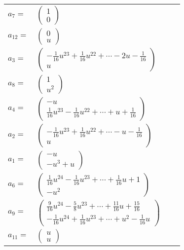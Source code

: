 \documentclass[1p]{elsarticle_modified}
\theoremstyle{definition}
\begin{document}
\begin{tabular}{m{7pt} m{180pt} m{7pt} m{180pt} }
\flushright $a_{7}=$&$\begin{pmatrix}1\\0\end{pmatrix}$ \\
\flushright $a_{12}=$&$\begin{pmatrix}0\\u\end{pmatrix}$ \\
\flushright $a_{3}=$&$\begin{pmatrix}-\frac{1}{16} u^{23}+\frac{1}{16} u^{22}+\cdots-2 u-\frac{1}{16}\\u\end{pmatrix}$ \\
\flushright $a_{8}=$&$\begin{pmatrix}1\\u^2\end{pmatrix}$ \\
\flushright $a_{4}=$&$\begin{pmatrix}- u\\\frac{1}{16} u^{23}-\frac{1}{16} u^{22}+\cdots+u+\frac{1}{16}\end{pmatrix}$ \\
\flushright $a_{2}=$&$\begin{pmatrix}-\frac{1}{16} u^{23}+\frac{1}{16} u^{22}+\cdots- u-\frac{1}{16}\\u\end{pmatrix}$ \\
\flushright $a_{1}=$&$\begin{pmatrix}- u\\- u^3+u\end{pmatrix}$ \\
\flushright $a_{6}=$&$\begin{pmatrix}\frac{1}{16} u^{24}-\frac{1}{16} u^{23}+\cdots+\frac{1}{16} u+1\\- u^2\end{pmatrix}$ \\
\flushright $a_{9}=$&$\begin{pmatrix}\frac{9}{16} u^{24}-\frac{5}{8} u^{23}+\cdots+\frac{11}{16} u+\frac{15}{16}\\-\frac{1}{16} u^{24}+\frac{1}{16} u^{23}+\cdots+u^2-\frac{1}{16} u\end{pmatrix}$ \\
\flushright $a_{11}=$&$\begin{pmatrix}u\\u\end{pmatrix}$ \\

\end{tabular}
\end{document}
